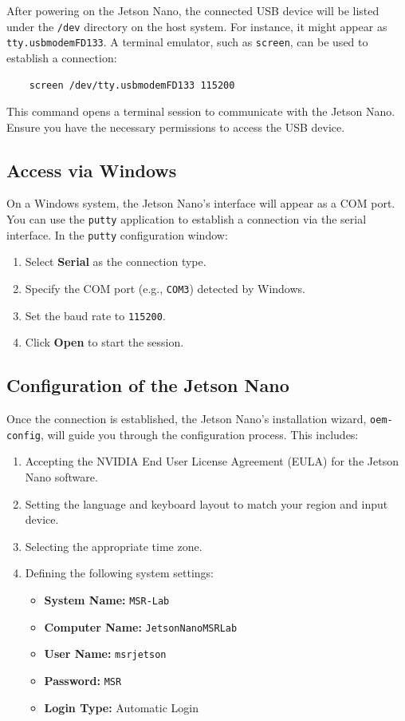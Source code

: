 After powering on the Jetson Nano, the connected USB device will be listed under the \texttt{/dev} directory on the host system. For instance, it might appear as \texttt{tty.usbmodemFD133}. A terminal emulator, such as \texttt{screen}, can be used to establish a connection:

\begin{verbatim}
	screen /dev/tty.usbmodemFD133 115200
\end{verbatim}

This command opens a terminal session to communicate with the Jetson Nano. Ensure you have the necessary permissions to access the USB device.

\subsection{Access via Windows}

On a Windows system, the Jetson Nano's interface will appear as a COM port. You can use the \texttt{putty} application to establish a connection via the serial interface. In the \texttt{putty} configuration window:
\begin{enumerate}
	\item Select \textbf{Serial} as the connection type.
	\item Specify the COM port (e.g., \texttt{COM3}) detected by Windows.
	\item Set the baud rate to \texttt{115200}.
	\item Click \textbf{Open} to start the session.
\end{enumerate}

\subsection{Configuration of the Jetson Nano}

Once the connection is established, the Jetson Nano's installation wizard, \texttt{oem-config}, will guide you through the configuration process. This includes:
\begin{enumerate}
	\item Accepting the NVIDIA End User License Agreement (EULA) for the Jetson Nano software.
	\item Setting the language and keyboard layout to match your region and input device.
	\item Selecting the appropriate time zone.
	\item Defining the following system settings:
	\begin{itemize}
		\item \textbf{System Name:} \texttt{MSR-Lab}
		\item \textbf{Computer Name:} \texttt{JetsonNanoMSRLab}
		\item \textbf{User Name:} \texttt{msrjetson}
		\item \textbf{Password:} \texttt{MSR}
		\item \textbf{Login Type:} Automatic Login
	\end{itemize}
\end{enumerate}

